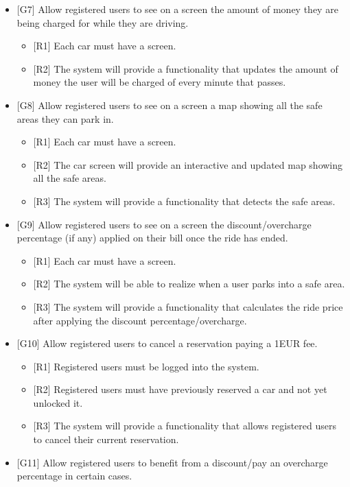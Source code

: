 \begin{itemize}
	\item {[G7]} Allow registered users to see on a screen the amount of money they are being charged for while they are driving. 
	\begin{itemize}
		\item {[R1]} Each car must have a screen. 
		\item {[R2]} The system will provide a functionality that updates the amount of money the user will be charged of every minute that passes. 
	\end{itemize}
	\item {[G8]} Allow registered users to see on a screen a map showing all the safe areas they can park in. 
	\begin{itemize}
		\item {[R1]} Each car must have a screen.
		\item {[R2]} The car screen will provide an interactive and updated map showing all the safe areas.
		\item {[R3]} The system will provide a functionality that detects the safe areas.
	\end{itemize}
	\item {[G9]} Allow registered users to see on a screen the discount/overcharge percentage (if any) applied on their bill once the ride has ended.
	\begin{itemize}
		\item {[R1]} Each car must have a screen.
		\item {[R2]} The system will be able to realize when a user parks into a safe area.
		\item {[R3]} The system will provide a functionality that calculates the ride price after applying the discount percentage/overcharge.
	\end{itemize}
	\item {[G10]} Allow registered users to cancel a reservation paying a 1EUR fee.
	\begin{itemize}
		\item {[R1]} Registered users must be logged into the system.
		\item {[R2]} Registered users must have previously reserved a car and not yet unlocked it.
		\item {[R3]} The system will provide a functionality that allows registered users to cancel their current reservation.
	\end{itemize}
	\item {[G11]} Allow registered users to benefit from a discount/pay an overcharge percentage in certain cases.

\end{itemize}
